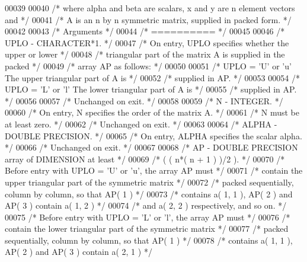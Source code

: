 \begin{DoxyCode}
00039 
00040 \textcolor{comment}{/*  where alpha and beta are scalars, x and y are n element vectors and */}
00041 \textcolor{comment}{/*  A is an n by n symmetric matrix, supplied in packed form. */}
00042 
00043 \textcolor{comment}{/*  Arguments */}
00044 \textcolor{comment}{/*  ========== */}
00045 
00046 \textcolor{comment}{/*  UPLO   - CHARACTER*1. */}
00047 \textcolor{comment}{/*           On entry, UPLO specifies whether the upper or lower */}
00048 \textcolor{comment}{/*           triangular part of the matrix A is supplied in the packed */}
00049 \textcolor{comment}{/*           array AP as follows: */}
00050 
00051 \textcolor{comment}{/*              UPLO = 'U' or 'u'   The upper triangular part of A is */}
00052 \textcolor{comment}{/*                                  supplied in AP. */}
00053 
00054 \textcolor{comment}{/*              UPLO = 'L' or 'l'   The lower triangular part of A is */}
00055 \textcolor{comment}{/*                                  supplied in AP. */}
00056 
00057 \textcolor{comment}{/*           Unchanged on exit. */}
00058 
00059 \textcolor{comment}{/*  N      - INTEGER. */}
00060 \textcolor{comment}{/*           On entry, N specifies the order of the matrix A. */}
00061 \textcolor{comment}{/*           N must be at least zero. */}
00062 \textcolor{comment}{/*           Unchanged on exit. */}
00063 
00064 \textcolor{comment}{/*  ALPHA  - DOUBLE PRECISION. */}
00065 \textcolor{comment}{/*           On entry, ALPHA specifies the scalar alpha. */}
00066 \textcolor{comment}{/*           Unchanged on exit. */}
00067 
00068 \textcolor{comment}{/*  AP     - DOUBLE PRECISION array of DIMENSION at least */}
00069 \textcolor{comment}{/*           ( ( n*( n + 1 ) )/2 ). */}
00070 \textcolor{comment}{/*           Before entry with UPLO = 'U' or 'u', the array AP must */}
00071 \textcolor{comment}{/*           contain the upper triangular part of the symmetric matrix */}
00072 \textcolor{comment}{/*           packed sequentially, column by column, so that AP( 1 ) */}
00073 \textcolor{comment}{/*           contains a( 1, 1 ), AP( 2 ) and AP( 3 ) contain a( 1, 2 ) */}
00074 \textcolor{comment}{/*           and a( 2, 2 ) respectively, and so on. */}
00075 \textcolor{comment}{/*           Before entry with UPLO = 'L' or 'l', the array AP must */}
00076 \textcolor{comment}{/*           contain the lower triangular part of the symmetric matrix */}
00077 \textcolor{comment}{/*           packed sequentially, column by column, so that AP( 1 ) */}
00078 \textcolor{comment}{/*           contains a( 1, 1 ), AP( 2 ) and AP( 3 ) contain a( 2, 1 ) */}

\end{DoxyCode}
